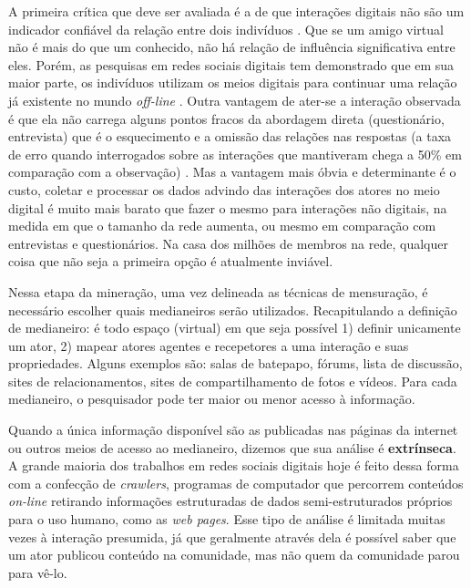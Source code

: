 \documentclass{article}
\begin{document}
A primeira crítica que deve ser avaliada é a de que interações digitais não são
um indicador confiável da relação entre dois indivíduos \cite{Clemons2007}. Que
se um amigo virtual não é mais do que um conhecido, não há relação de influência
significativa entre eles. Porém, as pesquisas em redes sociais digitais tem
demonstrado que em sua maior parte, os indivíduos utilizam os meios digitais para
continuar uma relação já existente no mundo \textit{off-line}
\cite{Haythornthwaite2005} \cite{Recuero2008} \cite{Sassen2002}. Outra vantagem
de ater-se a interação observada é que ela não carrega alguns pontos fracos da
abordagem direta (questionário, entrevista) que é o esquecimento e a omissão das
relações nas respostas (a taxa de erro quando interrogados sobre as interações
que mantiveram chega a 50\% em comparação com a observação) \cite{Mislove2007}.
Mas a vantagem mais óbvia e determinante é o custo, coletar e processar os dados
advindo das interações dos atores no meio digital é muito mais barato que fazer o
mesmo para interações não digitais, na medida em que o tamanho da rede aumenta,
ou mesmo em comparação com entrevistas e questionários. Na casa dos milhões de
membros na rede, qualquer coisa que não seja a primeira opção é atualmente
inviável.

Nessa etapa da mineração, uma vez delineada as técnicas de mensuração, é
necessário escolher quais medianeiros serão utilizados. Recapitulando a definição
de medianeiro: é todo espaço (virtual) em que seja possível 1) definir unicamente
um ator, 2) mapear atores agentes e recepetores a uma interação e suas
propriedades. Alguns exemplos são: salas de batepapo, fórums, lista de discussão,
sites de relacionamentos, sites de compartilhamento de fotos e vídeos. Para cada
medianeiro, o pesquisador pode ter maior ou menor acesso à informação.

Quando a única informação disponível são as publicadas nas páginas da internet
ou outros meios de acesso ao medianeiro, dizemos que sua análise é
\textbf{extrínseca}. A grande maioria dos trabalhos em redes sociais digitais
hoje é feito dessa forma com a confecção de \textit{crawlers}, programas de
computador que percorrem conteúdos \textit{on-line} retirando informações
estruturadas de dados semi-estruturados próprios para o uso humano, como as
\textit{web pages}. Esse tipo de análise é limitada muitas vezes à interação
presumida, já que geralmente através dela é possível saber que um ator publicou
conteúdo na comunidade, mas não quem da comunidade parou para vê-lo.
\end{document}
